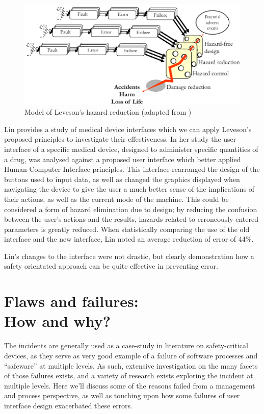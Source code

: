 \documentclass{cshonours}
\begin{document}
\begin{figure}
 \includegraphics[width=\textwidth]{figs/besnardmodified.pdf}
 \caption{Model of Leveson's hazard reduction (adapted from \cite[fig.~6]{besnard2003human})}
 \label{fig:besnardmodel}
\end{figure}

Lin \cite{lin2001patient} provides a study of medical device interfaces which we can apply Leveson's proposed principles to investigate their effectiveness. In her study the user interface of a specific medical device, designed to administer specific quantities of a drug, was analysed against a proposed user interface which better applied Human-Computer Interface principles. This interface rearranged the design of the buttons used to input data, as well as changed the graphics displayed when navigating the device to give the user a much better sense of the implications of their actions, as well as the current mode of the machine. This could be considered a form of hazard elimination due to design; by reducing the confusion between the user's actions and the results, hazards related to erroneously entered parameters is greatly reduced. When statistically comparing the use of the old interface and the new interface, Lin noted an average reduction of error of 44\%.

Lin's changes to the interface were not drastic, but clearly demonstration how a safety orientated approach can be quite effective in preventing error.


\chapter{Flaws and failures:\\How and why?}
\label{chap:flawsfailures}
The \ther incidents are generally used as a case-study in literature on safety-critical devices, as they serve as very good example of a failure of software processes and ``safeware'' at multiple levels. As such, extensive investigation on the many facets of those failures exists, and a variety of research exists exploring the incident at multiple levels. Here we'll discuss some of the reasons \ther failed from a management and process perspective, as well as touching upon how some failures of user interface design exacerbated these errors.
\end{document}
